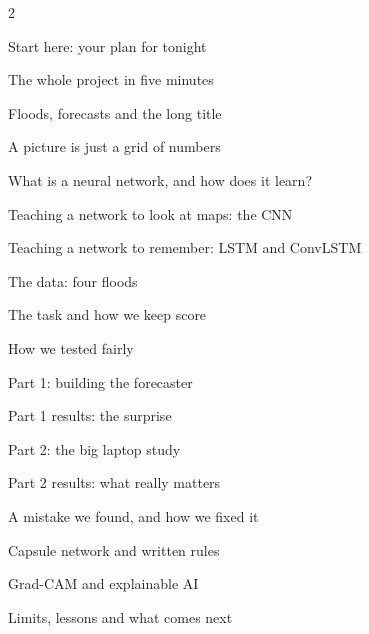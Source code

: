 \documentclass[9pt,a4paper]{extarticle}
\begin{document}
{\footnotesize\begin{multicols}{2}\setlength{\parskip}{0pt}\raggedright
\noindent\makebox[1.3em][l]{\ref{ch:start}}Start here: your plan for tonight\dotfill\pageref{ch:start}\par
\noindent\makebox[1.3em][l]{\ref{ch:whole}}The whole project in five minutes\dotfill\pageref{ch:whole}\par
\noindent\makebox[1.3em][l]{\ref{ch:why}}Floods, forecasts and the long title\dotfill\pageref{ch:why}\par
\noindent\makebox[1.3em][l]{\ref{ch:grid}}A picture is just a grid of numbers\dotfill\pageref{ch:grid}\par
\noindent\makebox[1.3em][l]{\ref{ch:nn}}What is a neural network, and how does it learn?\dotfill\pageref{ch:nn}\par
\noindent\makebox[1.3em][l]{\ref{ch:cnn}}Teaching a network to look at maps: the CNN\dotfill\pageref{ch:cnn}\par
\noindent\makebox[1.3em][l]{\ref{ch:lstm}}Teaching a network to remember: LSTM and ConvLSTM\dotfill\pageref{ch:lstm}\par
\noindent\makebox[1.3em][l]{\ref{ch:data}}The data: four floods\dotfill\pageref{ch:data}\par
\noindent\makebox[1.3em][l]{\ref{ch:score}}The task and how we keep score\dotfill\pageref{ch:score}\par
\noindent\makebox[1.3em][l]{\ref{ch:test}}How we tested fairly\dotfill\pageref{ch:test}\par
\noindent\makebox[1.3em][l]{\ref{ch:build}}Part 1: building the forecaster\dotfill\pageref{ch:build}\par
\noindent\makebox[1.3em][l]{\ref{ch:res1}}Part 1 results: the surprise\dotfill\pageref{ch:res1}\par
\noindent\makebox[1.3em][l]{\ref{ch:p2set}}Part 2: the big laptop study\dotfill\pageref{ch:p2set}\par
\noindent\makebox[1.3em][l]{\ref{ch:res2}}Part 2 results: what really matters\dotfill\pageref{ch:res2}\par
\noindent\makebox[1.3em][l]{\ref{ch:bug}}A mistake we found, and how we fixed it\dotfill\pageref{ch:bug}\par
\noindent\makebox[1.3em][l]{\ref{ch:capsule}}Capsule network and written rules\dotfill\pageref{ch:capsule}\par
\noindent\makebox[1.3em][l]{\ref{ch:gradcam}}Grad-CAM and explainable AI\dotfill\pageref{ch:gradcam}\par
\noindent\makebox[1.3em][l]{\ref{ch:limits}}Limits, lessons and what comes next\dotfill\pageref{ch:limits}\par

\end{multicols}}
\end{document}
